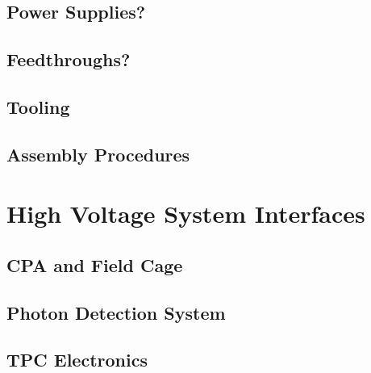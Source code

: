 \subsection{Power Supplies?}
\label{sec:fdsp-hv-supplies}

\subsection{Feedthroughs?}
\label{sec:fdsp-hv-feedthroughs}


\subsection{Tooling}
\label{sec:fdsp-hv-tooling}


\subsection{Assembly Procedures}
\label{sec:fdsp-hv-assy}



\section{High Voltage System Interfaces}
\label{sec:fdsp-hv-intfc}



\subsection{CPA and Field Cage}
\label{sec:fdsp-hv-intfc-cpa-fc}


\subsection{Photon Detection System}
\label{sec:fdsp-hv-intfc-pds}


\subsection{TPC Electronics}
\label{sec:fdsp-hv-intfc-elec}



